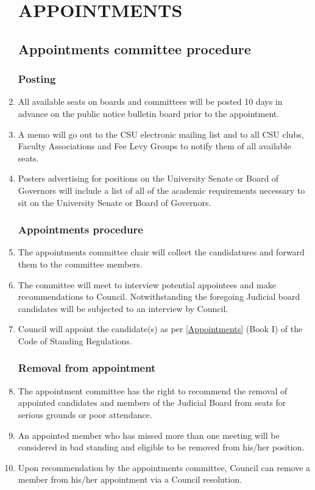 \documentclass[oneside]{book}
\begin{document}
\begin{enumerate}
\part{\label{APPOINTMENTS}APPOINTMENTS }


\chapter{\label{Appointments_committee_procedure}Appointments committee procedure }


\section{\label{Posting}Posting }
\item All available seats on boards and committees will be posted 10 days
in advance on the public notice bulletin board prior to the appointment. 
\item A memo will go out to the CSU electronic mailing list and to all CSU
clubs, Faculty Associations and Fee Levy Groups to notify them of
all available seats. 
\item Posters advertising for positions on the University Senate or Board
of Governors will include a list of all of the academic requirements
necessary to sit on the University Senate or Board of Governors. 

\section{\label{Appointments_procedure}Appointments procedure }
\item The appointments committee chair will collect the candidatures and
forward them to the committee members. 
\item The committee will meet to interview potential appointees and make
recommendations to Council. Notwithstanding the foregoing Judicial
board candidates will be subjected to an interview by Council. 
\item Council will appoint the candidate(s) as per \autoref{Appointments} (Book I) of the Code
of Standing Regulations. 

\section{\label{Removal_from_appointment}Removal from appointment }
\item The appointment committee has the right to recommend the removal of
appointed candidates and members of the Judicial Board from seats
for serious grounds or poor attendance. 
\item An appointed member who has missed more than one meeting will be considered
in bad standing and eligible to be removed from his/her position. 
\item Upon recommendation by the appointments committee, Council can remove
a member from his/her appointment via a Council resolution. 


\end{enumerate}
\end{document}
